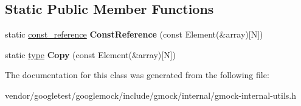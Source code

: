 \subsection*{Static Public Member Functions}
\begin{DoxyCompactItemize}
\item 
static \hyperlink{classtesting_1_1internal_1_1NativeArray}{const\+\_\+reference} {\bfseries Const\+Reference} (const Element(\&array)\mbox{[}N\mbox{]})\hypertarget{classtesting_1_1internal_1_1StlContainerView_3_01Element[N]_4_aa1b15d7f43d38751ae19f6dbdcb6aba3}{}\label{classtesting_1_1internal_1_1StlContainerView_3_01Element[N]_4_aa1b15d7f43d38751ae19f6dbdcb6aba3}

\item 
static \hyperlink{classtesting_1_1internal_1_1NativeArray}{type} {\bfseries Copy} (const Element(\&array)\mbox{[}N\mbox{]})\hypertarget{classtesting_1_1internal_1_1StlContainerView_3_01Element[N]_4_af2cf79fbd7f829229a47b52f863c68f8}{}\label{classtesting_1_1internal_1_1StlContainerView_3_01Element[N]_4_af2cf79fbd7f829229a47b52f863c68f8}

\end{DoxyCompactItemize}


The documentation for this class was generated from the following file\+:\begin{DoxyCompactItemize}
\item 
vendor/googletest/googlemock/include/gmock/internal/gmock-\/internal-\/utils.\+h\end{DoxyCompactItemize}
